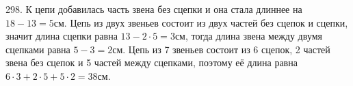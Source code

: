 298. К цепи добавилась часть звена без сцепки и она стала длиннее на $18-13=5$см. Цепь из двух звеньев состоит из двух частей без сцепок и сцепки, значит длина сцепки равна $13-2\cdot5=3$см, тогда длина звена между двумя сцепками равна $5-3=2$см. Цепь из 7 звеньев состоит из 6 сцепок, 2 частей звена без сцепок и 5 частей между сцепками, поэтому её длина равна $6\cdot3+2\cdot5+5\cdot2=38$см.\\

